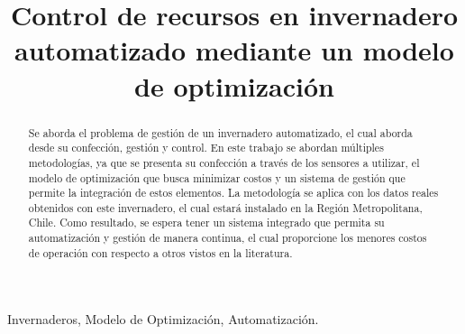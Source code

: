 \documentclass[letterpaper,conference]{IEEEtran}
\begin{document}
\title{Control de recursos en invernadero automatizado mediante un modelo de optimización}

\author{

}
\maketitle

\maketitle

\thispagestyle{plain}
\pagestyle{plain}

\begin{abstract}
Se aborda el problema de gestión de un invernadero automatizado, el cual aborda desde su confección, gestión y control. En este trabajo se abordan múltiples metodologías, ya que se presenta su confección a través de los sensores a utilizar, el modelo de optimización que busca minimizar costos y un sistema de gestión que permite la integración de estos elementos. La metodología se aplica con los datos reales obtenidos con este invernadero, el cual estará instalado en la Región Metropolitana, Chile. Como resultado, se espera tener un sistema integrado que permita su automatización y gestión de manera continua, el cual proporcione los menores costos de operación con respecto a otros vistos en la literatura.
\end{abstract}

\begin{IEEEkeywords}
	Invernaderos, Modelo de Optimización, Automatización.
\end{IEEEkeywords}
\end{document}
